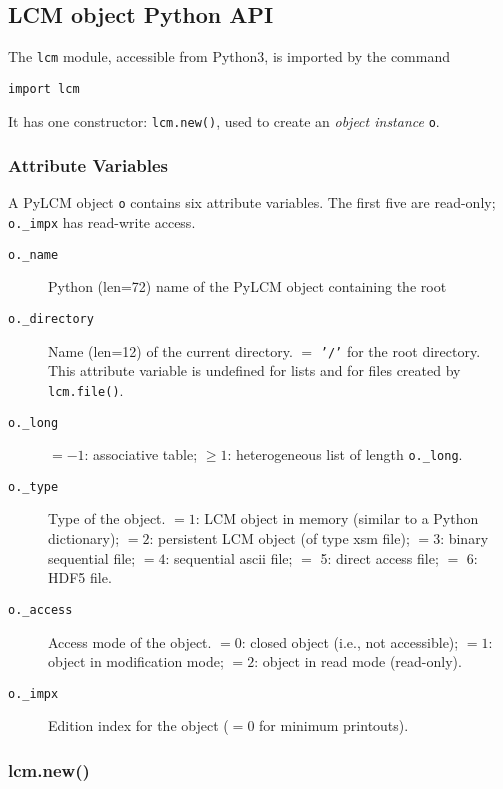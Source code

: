 \vskip 0.8cm

\subsection{LCM object Python API} \label {sect: APIP}

The {\tt lcm} module, accessible from Python3, is imported by the command
\begin{verbatim}
import lcm
\end{verbatim}
It has one constructor: {\tt lcm.new()}, used to create an {\sl object instance} {\tt o}.

\subsubsection{Attribute Variables }

A PyLCM object {\tt o} contains six attribute variables. The first five are read-only; {\tt o.\_impx} has read-write access.

\begin {description}
\item [{\tt o.\_name}] Python (len=72) name of the PyLCM object containing the root
\item [{\tt o.\_directory}] Name (len=12) of the current directory. $=$ {\tt '/'} for the
root directory. This attribute variable is undefined for
lists and for files created by {\tt lcm.file()}.
\item [{\tt o.\_long}] $ = - 1 $: associative table; $ \ge 1 $: heterogeneous list of length {\tt o.\_long}.
\item [{\tt o.\_type}] Type of the object. $ = 1 $: LCM object in memory
(similar to a Python dictionary); $ = 2 $: persistent LCM object (of type {\sc xsm} file);
$ = 3 $: binary sequential file; $ = 4 $: sequential {\sc ascii} file; $=$ 5:
direct access file; $=$ 6: HDF5 file.
\item [{\tt o.\_access}] Access mode of the object. $ = 0 $: closed object (i.e., not
accessible); $ = 1 $: object in modification mode; $ = 2 $: object in read mode
(read-only).
\item [{\tt o.\_impx}] Edition index for the object ($=0$ for minimum printouts).
\end {description}

\subsubsection{lcm.new()}

